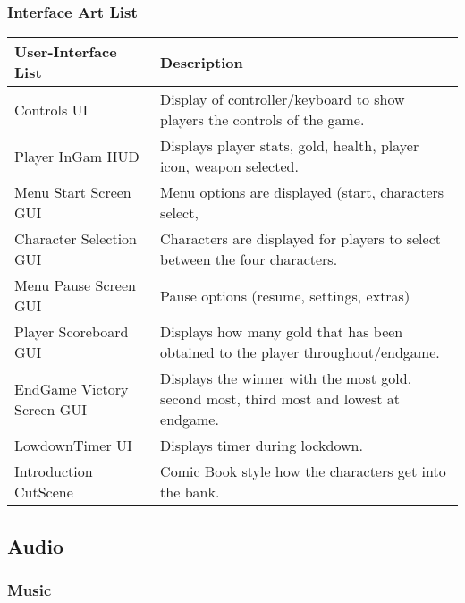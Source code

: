 \documentclass[10pt]{report}
\begin{document}
\subsubsection{Interface Art List}
\begin{center}
    \begin{tabular}{| p{.45\linewidth} | p{.45\linewidth} |}
        \hline
        \textbf{User-Interface List}     &   \textbf{Description}  \\ \hline
        Controls UI     &   Display of controller/keyboard to show players the controls of the game.  \\ \hline
        Player InGam HUD   &   Displays player stats, gold, health, player icon, weapon selected.  \\ \hline
        Menu Start Screen GUI   &   Menu options are displayed (start, characters select,   \\ \hline
        Character Selection GUI     &   Characters are displayed for players to select between the four characters.   \\ \hline
        Menu Pause Screen GUI   &   Pause options (resume, settings, extras)  \\ \hline
        Player Scoreboard GUI   &   Displays how many gold that has been obtained to the player throughout/endgame.  \\ \hline
        EndGame Victory Screen GUI  &   Displays the winner with the most gold, second most, third most and lowest at endgame.   \\ \hline
        LowdownTimer UI &   Displays timer during lockdown. \\ \hline
        Introduction CutScene   &   Comic Book style how the characters get into the bank.  \\
        \hline
    \end{tabular}
\end{center}


\subsection{Audio}

\subsubsection{Music}
\end{document}
